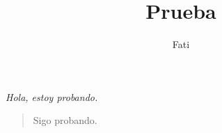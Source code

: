 \documentclass{article}
\begin{document}
\title{Prueba}
\author{Fati}
\maketitle

\emph{Hola, estoy probando.}

\begin{verse}
Sigo probando. 
\end{verse}
\end{document}
